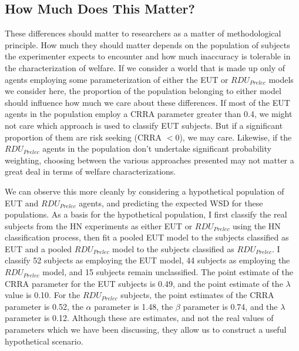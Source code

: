 \documentclass[../main.tex]{subfiles}
\begin{document}
\singlespacing
\subsection{How Much Does This Matter?}
\doublespacing

These differences should matter to researchers as a matter of methodological principle.
How much they should matter depends on the population of subjects the experimenter expects to encounter and how much inaccuracy is tolerable in the characterization of welfare.
If we consider a world that is made up only of agents employing some parameterization of either the EUT or $\mathit{RDU_{Prelec}}$ models we consider here, the proportion of the population belonging to either model should influence how much we care about these differences.
If most of the EUT agents in the population employ a CRRA parameter greater than 0.4, we might not care which approach is used to classify EUT subjects.
But if a significant proportion of them are risk seeking (CRRA $< 0$), we may care.
Likewise, if the $\mathit{RDU_{Prelec}}$ agents in the population don't undertake significant probability weighting, choosing between the various approaches presented may not matter a great deal in terms of welfare characterizations.

We can observe this more cleanly by considering a hypothetical population of EUT and $\mathit{RDU_{Prelec}}$ agents, and predicting the expected WSD for these populations.
As a basis for the hypothetical population, I first classify the real subjects from the HN experiments as either EUT or $\mathit{RDU_{Prelec}}$ using the HN classification process, then fit a pooled EUT model to the subjects classified as EUT and a pooled $\mathit{RDU_{Prelec}}$ model to the subjects classified as $\mathit{RDU_{Prelec}}$.
I classify 52 subjects as employing the EUT model, 44 subjects as employing the $\mathit{RDU_{Prelec}}$ model, and 15 subjects remain unclassified.
The point estimate of the CRRA parameter for the EUT subjects is 0.49, and the point estimate of the $\lambda$ value is 0.10.
For the $\mathit{RDU_{Prelec}}$ subjects, the point estimates of the CRRA parameter is 0.52, the $\alpha$ parameter is 1.48, the $\beta$ parameter is 0.74, and the $\lambda$ parameter is 0.12.
Although these are estimates, and not the real values of parameters which we have been discussing, they allow us to construct a useful hypothetical scenario.
\end{document}
